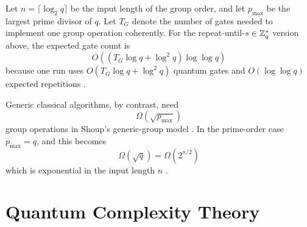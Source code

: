 Let
\(
n=\lceil\log_2q\rceil
\) be the input length of the group order, and let \(p_{\max}\) be the largest prime divisor of \(q\).
Let \(T_G\) denote the number of gates needed to implement one group operation coherently.
For the repeat-until-\(s\in\mathbb{Z}_q^*\) version above,
the expected gate count is
\[
O\!\left((T_G\log q+\log^2q)\log\log q\right)
\]
because one run uses \(O(T_G\log q+\log^2q)\) quantum gates and \(O(\log\log q)\) expected repetitions
\cite{laneveQuantumAlgorithms,wikipediaQFTGateCount,wikipediaTotientGrowth}.

\pagebreak[2]

Generic classical algorithms, by contrast, need
\[
\Omega(\sqrt{p_{\max}})
\]
group operations in Shoup's generic-group model \cite{shoupGenericDLP}.
In the prime-order case \(p_{\max}=q\), and this becomes
\[
\Omega(\sqrt q)
=
\Omega(2^{n/2})
\]
which is exponential in the input length \(n\) \cite{shoupGenericDLP,hhanYamakawaYunDiscreteLog}.



\clearpage



\section{Quantum Complexity Theory}\label{sec:quantum-complexity-theory}



